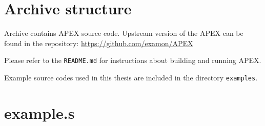\documentclass[12pt, twoside]{fithesis2}
\renewcommand{\_}{\leavevmode \kern0.07em\vbox{\hrule width0.4em}}
\begin{document}
\appendix

\printbibliography

\chapter{Archive structure}
\label{appendix:archive}

Archive contains APEX source code. Upstream version of the APEX can be found in
the repository: \url{https://github.com/examon/APEX}

Please refer to the \texttt{README.md} for instructions about building
and running APEX.

Example source codes used in this thesis are included in the directory
\texttt{examples}.


\chapter{example.s}
\label{appendix:example}
\end{document}
